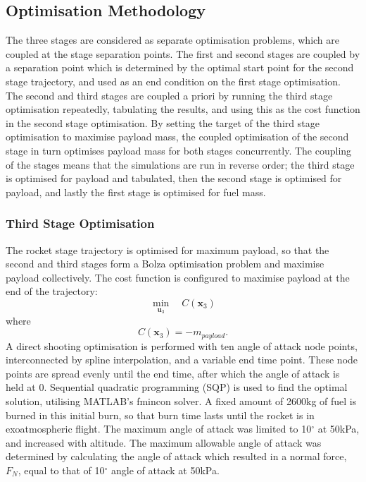 \documentclass[]{aiaa-tc}
\begin{document}
\subsection{Optimisation Methodology}
	 The three stages are considered as separate optimisation problems, which are coupled at the stage separation points.  
	 The first and second stages are coupled by a separation point which is determined by the optimal start point for the second stage trajectory, and used as an end condition on the first stage optimisation.
	 The second and third stages are coupled a priori by running the third stage optimisation repeatedly, tabulating the results, and using this as the cost function in the second stage optimisation. By setting the target of the third stage optimisation to maximise payload mass, the coupled optimisation of the second stage in turn optimises payload mass for both stages concurrently.
	 The coupling of the stages means that the simulations are run in reverse order; the third stage is optimised for payload and tabulated, then the second stage is optimised for payload, and lastly the first stage is optimised for fuel mass. 
	 
	  \subsubsection{Third Stage Optimisation}
	  
	  
	  The rocket stage trajectory is optimised for maximum payload, so that the second and third stages form a Bolza optimisation problem and maximise payload collectively. The cost function is configured to maximise payload at the end of the trajectory:
	  \begin{equation} 
	  \min\limits_{\textbf{u}_3} \quad C(\textbf{x}_{3}) 
	  \end{equation}
	  where
	  \begin{equation}
	  C(\textbf{x}_{3}) = -m_{payload}.
	  \end{equation}
	  A direct shooting optimisation is performed with ten angle of attack node points, interconnected by spline interpolation, and a variable end time point. These node points are spread evenly until the end time, after which the angle of attack is held at 0. Sequential quadratic programming (SQP) is used to find the optimal solution, utilising MATLAB's fmincon solver. A fixed amount of 2600kg of fuel is burned in this initial burn, so that burn time lasts until the rocket is in exoatmospheric flight. The maximum angle of attack was limited to 10$^\circ$ at 50kPa, and increased with altitude. The maximum allowable angle of attack was determined by calculating the angle of attack which resulted in a normal force, $F_N$, equal to that of 10$^\circ$ angle of attack at 50kPa. 
	  
\end{document}
